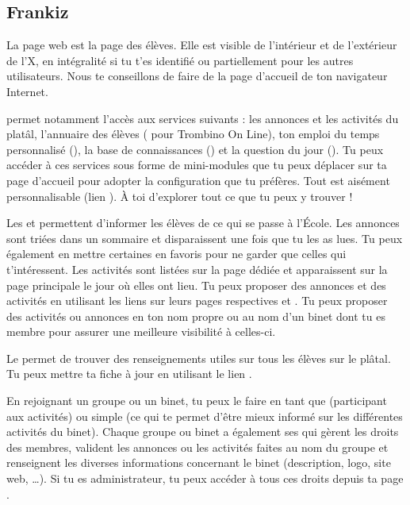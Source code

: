 \subsection{Frankiz}
\label{frankiz} La page web \fkz est la page des \'el\`eves. Elle est visible de l'int\'erieur et de
l'ext\'erieur de l'X, en int\'egralit\'e si tu t'es identifi\'e ou partiellement pour les autres
utilisateurs. Nous te conseillons de faire de  la page d'accueil de ton navigateur Internet.

\fkz permet notamment l'acc\`es aux services suivants : les
annonces et les activit\'es du plat\^al, l'annuaire des \'el\`eves
( pour Trombino On Line), ton emploi du temps personnalis\'e (), la base de connaissances () et
la question du jour (). Tu peux accéder à ces services sous forme de mini-modules que tu peux d\'eplacer sur ta page d'accueil pour adopter la configuration que tu préfères.
Tout est ais\'ement personnalisable (lien ). \`A toi d'explorer tout ce que tu peux y trouver !

Les  et  permettent d'informer les \'el\`eves de ce qui se passe \`a  l'\'Ecole. Les annonces sont tri\'ees dans
un sommaire et disparaissent une fois que tu les as lues. Tu peux \'egalement en mettre certaines en favoris pour ne garder que celles qui t'int\'eressent. Les activit\'es sont list\'ees sur la page d\'edi\'ee et apparaissent
sur la page principale le jour o\`u elles ont lieu. Tu peux proposer des annonces et des activit\'es en utilisant les liens sur leurs pages respectives  et . Tu peux proposer des activit\'es ou annonces en ton nom propre ou au nom d'un binet dont tu es membre pour assurer une meilleure visibilit\'e \`a celles-ci.

Le  permet de trouver des renseignements utiles sur
tous les \'el\`eves sur le pl\^atal. Tu peux mettre ta fiche \`a  jour en
utilisant le lien .

En rejoignant un groupe ou un binet, tu peux le faire en tant que  (participant aux activit\'es) ou simple  (ce qui te permet d'être mieux informé sur les différentes activités du binet). Chaque groupe ou binet a \'egalement ses  qui g\`erent les droits des membres, valident les annonces ou les activit\'es faites au nom du groupe et renseignent les diverses informations concernant le binet (description, logo, site web, \dots). Si tu es administrateur, tu peux acc\'eder \`a tous ces droits depuis ta page .

